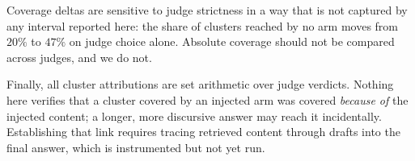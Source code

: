 \documentclass[11pt]{article}
\theoremstyle{definition}
\begin{document}
Coverage deltas are sensitive to judge strictness in a way that is not captured
by any interval reported here: the share of clusters reached by no arm moves
from $20\%$ to $47\%$ on judge choice alone. Absolute coverage should not be
compared across judges, and we do not.

Finally, all cluster attributions are set arithmetic over judge verdicts.
Nothing here verifies that a cluster covered by an injected arm was covered
\emph{because of} the injected content; a longer, more discursive answer may
reach it incidentally. Establishing that link requires tracing retrieved content
through drafts into the final answer, which is instrumented but not yet run.
\end{document}
